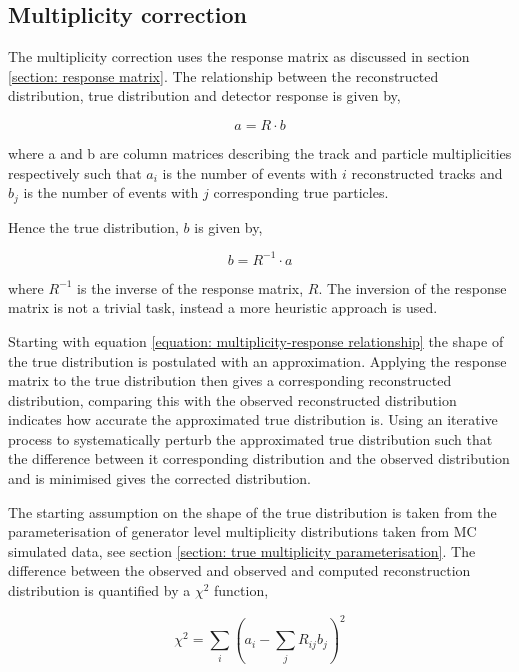\subsection*{Multiplicity correction}

The multiplicity correction uses the response matrix as discussed in section \ref{section: response matrix}. The relationship between the reconstructed distribution, true distribution and detector response is given by,

\begin{equation}
	\label{equation: multiplicity-response relationship}
	a = R \cdot b
\end{equation} 

where a and b are column matrices describing the track and particle multiplicities respectively such that $a_i$ is the number of events with $i$ reconstructed tracks and $b_j$ is the number of events with $j$ corresponding true particles.

Hence the true distribution, $b$ is given by,

\begin{equation}
	b = R^{-1} \cdot a
\end{equation} 

where $R^{-1}$ is the inverse of the response matrix, $R$. The inversion of the response matrix is not a trivial task, instead a more heuristic approach is used. 

Starting with equation \ref{equation: multiplicity-response relationship}
the shape of the true distribution is postulated with an approximation. Applying the response matrix to the true distribution then gives a corresponding reconstructed distribution, comparing this with the observed reconstructed distribution indicates how accurate the approximated true distribution is. Using an iterative process to systematically perturb the approximated true distribution such that the difference between it corresponding distribution and the observed distribution and is minimised gives the corrected distribution.

The starting assumption on the shape of the true distribution is taken from the parameterisation of generator level multiplicity distributions taken from MC simulated data, see section \ref{section: true multiplicity parameterisation}. The difference between the observed and observed and computed reconstruction distribution is quantified by a $\chi^2$ function, 

\begin{equation}
	\chi^2 = \sum_i (a_i - \sum_j R_{ij} b_j)^2
\end{equation}

